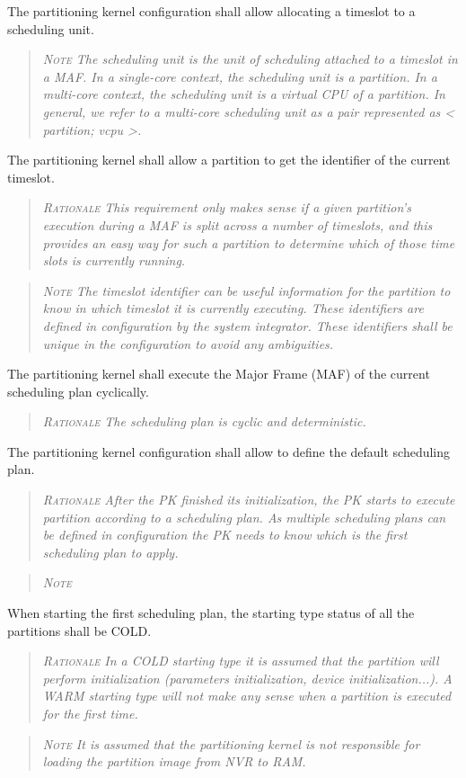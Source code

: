 The partitioning kernel configuration shall allow allocating a timeslot to a scheduling unit.
\begin{quote}\it
\textsc{Note}
The scheduling unit is the unit of scheduling attached to a timeslot in a MAF. In a single-core context, the scheduling unit is a partition. In a multi-core context, the scheduling unit is a virtual CPU of a partition. In general, we refer to a multi-core scheduling unit as a pair represented as < partition; vcpu >.
\end{quote}

The partitioning kernel shall allow a partition to get the identifier of the current timeslot.
\begin{quote}\it
\textsc{Rationale}
This requirement only makes sense if a given partition's execution during a MAF is split across a number of timeslots, and this provides an easy way for such a partition to determine which of those time slots is currently running.
\end{quote}
\begin{quote}\it
\textsc{Note}
The timeslot identifier can be useful information for the partition to know in which timeslot it is currently executing. These identifiers are defined in configuration by the system integrator. These identifiers shall be unique in the configuration to avoid any ambiguities.
\end{quote}

The partitioning kernel shall execute the Major Frame (MAF) of the current scheduling plan cyclically.
\begin{quote}\it
\textsc{Rationale}
The scheduling plan is cyclic and deterministic.
\end{quote}

The partitioning kernel configuration shall allow to define the default scheduling plan.
\begin{quote}\it
\textsc{Rationale}
After the PK finished its initialization, the PK starts to execute partition according to a scheduling plan. As multiple scheduling plans can be defined in configuration the PK needs to know which is the first scheduling plan to apply.
\end{quote}
\begin{quote}\it
\textsc{Note}

\end{quote}

When starting the first scheduling plan, the starting type status of all the partitions shall be COLD.
\begin{quote}\it
\textsc{Rationale}
In a COLD starting type it is assumed that the partition will perform initialization (parameters initialization, device initialization...). A WARM starting type will not make any sense when a partition is executed for the first time.
\end{quote}
\begin{quote}\it
\textsc{Note}
It is assumed that the partitioning kernel is not responsible for loading the partition image from NVR to RAM.
\end{quote}

